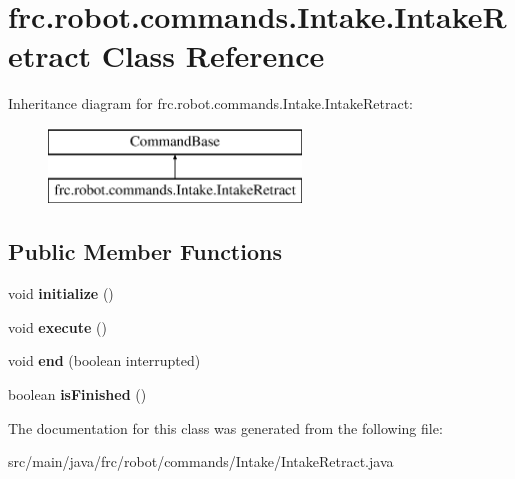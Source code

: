 \hypertarget{classfrc_1_1robot_1_1commands_1_1_intake_1_1_intake_retract}{}\section{frc.\+robot.\+commands.\+Intake.\+Intake\+Retract Class Reference}
\label{classfrc_1_1robot_1_1commands_1_1_intake_1_1_intake_retract}
Inheritance diagram for frc.\+robot.\+commands.\+Intake.\+Intake\+Retract\+:\begin{figure}[H]
\begin{center}
\leavevmode
\includegraphics[height=2.000000cm]{classfrc_1_1robot_1_1commands_1_1_intake_1_1_intake_retract}
\end{center}
\end{figure}
\subsection*{Public Member Functions}
\begin{DoxyCompactItemize}
\item 
\mbox{\label{classfrc_1_1robot_1_1commands_1_1_intake_1_1_intake_retract_af6efcfb75ba49f1a64684161adf87eac}} 
void {\bfseries initialize} ()
\item 
\mbox{\label{classfrc_1_1robot_1_1commands_1_1_intake_1_1_intake_retract_a652e3b7d7cea1723e2264f021a0ee2b5}} 
void {\bfseries execute} ()
\item 
\mbox{\label{classfrc_1_1robot_1_1commands_1_1_intake_1_1_intake_retract_a14a050dea7b432b4597b825e5c10502a}} 
void {\bfseries end} (boolean interrupted)
\item 
\mbox{\label{classfrc_1_1robot_1_1commands_1_1_intake_1_1_intake_retract_a388233ba00c131d6ae4f009129f793a9}} 
boolean {\bfseries is\+Finished} ()
\end{DoxyCompactItemize}


The documentation for this class was generated from the following file\+:\begin{DoxyCompactItemize}
\item 
src/main/java/frc/robot/commands/\+Intake/Intake\+Retract.\+java\end{DoxyCompactItemize}
